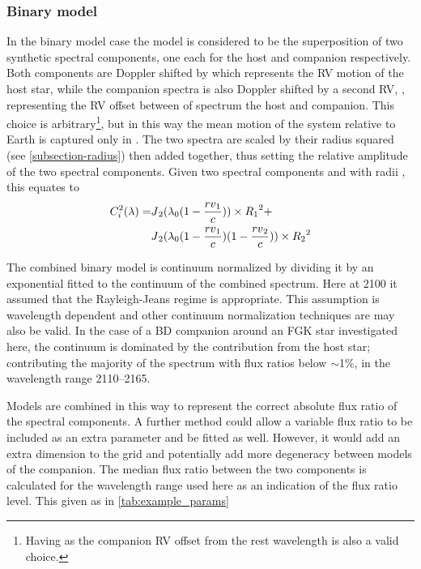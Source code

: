 \subsubsection{Binary model}
\label{subsubsec:binary-model}
In the binary model case the model is considered to be the superposition of two synthetic spectral components, one each for the host and companion respectively.
Both components are Doppler shifted by \Rvone{} which represents the {RV} motion of the host star, while the companion spectra is also Doppler shifted by a second {RV}, \Rvtwo{}, representing the {RV} offset between of spectrum the host and companion.
This choice is arbitrary\footnote{Having \Rvtwo{} as the companion {RV} offset from the rest wavelength is also a valid choice.}, but in this way the mean motion of the system relative to Earth is captured only in \Rvone{}.
The two spectra are scaled by their radius squared (see \cref{subsection-radius}) then added together, thus setting the relative amplitude of the two spectral components.
Given two spectral components \Jone{} and \Jtwo{} with radii \Rone{}, \Rtwo{} this equates to
\begin{align}
C^{2}_{i}(\lambda) = & {J{}}_{2}{}(\lambda_{0}(1 - \frac{{rv{}}_{1}{}}{c}))\times {{R}_{1}}^{2} +\nonumber \\
& {J{}}_{2}{}(\lambda_{0}(1 - \frac{{rv{}}_{1}{}}{c})(1 - \frac{{rv{}}_{2}{}}{c}))\times {{R}_{2}{}}^{2}
\end{align}

The combined binary model is continuum normalized by dividing it by an exponential fitted to the continuum of the combined spectrum.
Here at 2100\nm{} it assumed that the Rayleigh-Jeans regime is appropriate.
This assumption is wavelength dependent and other continuum normalization techniques are may also be valid.
In the case of a {BD} companion around an {FGK} star investigated here, the continuum is dominated by the contribution from the host star; contributing the majority of the spectrum with flux ratios below \(\sim\)1\%, in the wavelength range 2110--2165\nm{}.

Models are combined in this way to represent the correct absolute flux ratio of the spectral components.
A further method could allow a variable flux ratio to be included as an extra parameter and be fitted as well.
However, it would add an extra dimension to the \textchisquared{} grid and potentially add more degeneracy between models of the companion.
The median flux ratio between the two components is calculated for the wavelength range used here as an indication of the flux ratio level.
This given as \FtwoFone{} in \cref{tab:example_params}

